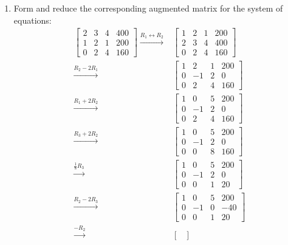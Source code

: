 \documentclass[12pt, a4paper]{article}
\begin{document}
\begin{enumerate}[Q\arabic*.]
\begin{enumerate}[(\alph*)]
      \item Form and reduce the corresponding augmented matrix for the system of equations:
        \begin{align*}
          \begin{bmatrix}
            2&3&4&400\\
            1&2&1&200\\
            0&2&4&160
          \end{bmatrix}\xrightarrow{R_1\leftrightarrow R_2}
          &\begin{bmatrix}
            1&2&1&200\\
            2&3&4&400\\
            0&2&4&160
          \end{bmatrix}\\\xrightarrow{R_2-2R_1}
          &\begin{bmatrix}
            1&2&1&200\\
            0&-1&2&0\\
            0&2&4&160
          \end{bmatrix}\\\xrightarrow{R_1+2R_2}
          &\begin{bmatrix}
            1&0&5&200\\
            0&-1&2&0\\
            0&2&4&160
          \end{bmatrix}\\\xrightarrow{R_3+2R_2}
          &\begin{bmatrix}
            1&0&5&200\\
            0&-1&2&0\\
            0&0&8&160
          \end{bmatrix}\\\xrightarrow{\frac{1}{8}R_3}
          &\begin{bmatrix}
            1&0&5&200\\
            0&-1&2&0\\
            0&0&1&20
          \end{bmatrix}\\\xrightarrow{R_2-2R_3}
          &\begin{bmatrix}
            1&0&5&200\\
            0&-1&0&-40\\
            0&0&1&20
          \end{bmatrix}\\\xrightarrow{-R_2}
          &\begin{bmatrix}

\end{bmatrix}
\end{align*}
\end{enumerate}
\end{enumerate}
\end{document}
